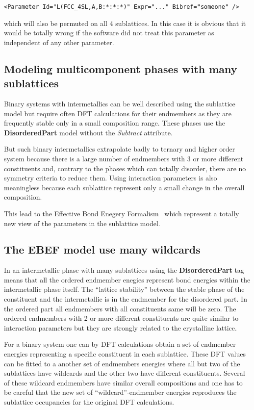 \documentclass{article}
\begin{document}
\begin{appendices}
\begin{verbatim}
<Parameter Id="L(FCC_4SL,A,B:*:*:*)" Expr="..." Bibref="someone" />
\end{verbatim}

\noindent
which will also be permuted on all 4 sublattices.  In this case it is
obvious that it would be totally wrong if the software did not treat
this parameter as independent of any other parameter.

\subsection{Modeling multicomponent phases with many sublattices}\label{sec:ms}

Binary systems with intermetallics can be well described using the
sublattice model but require often DFT calculations for their
endmembers as they are frequently stable only in a small composition
range.  These phases use the {\bf DisorderedPart} model without the
{\em Subtract} attribute.

But such binary intermetallics extrapolate badly to ternary and higher
order system because there is a large number of endmembers with 3 or
more different constituents and, contrary to the phases which can
totally disorder, there are no symmetry criteria to reduce them.
Using interaction parameters is also meaningless because each
sublattice represent only a small change in the overall composition.

This lead to the Effective Bond Enegery Formalism~\cite{18Dup} which
represent a totally new view of the parameters in the sublattice
model.

\subsection{The EBEF model use many wildcards}\label{sec:ebef}

In an intermetallic phase with many sublattices using the {\bf
  DisorderedPart} tag means that all the ordered endmember enegies
represent bond energies within the intermetallic phase itself.  The
``lattice stability'' between the stable phase of the constituent and
the intermetallic is in the endmember for the disordered part.  In the
ordered part all endmembers with all constituents same will be zero.
The ordered endmembers with 2 or more different constituents are quite
similar to interaction parameters but they are strongly related to the
crystalline lattice.

For a binary system one can by DFT calculations obtain a set of
endmember energies representing a specific constituent in each
sublattice.  These DFT values can be fitted to a another set of
endmembers energies where all but two of the sublattices have
wildcards and the other two have different constituents.  Several of
these wildcard endmembers have similar overall compositions and one
has to be careful that the new set of ``wildcard''-endmember energies
reproduces the sublattice occupancies for the original DFT
calculations.


\end{appendices}
\end{document}
